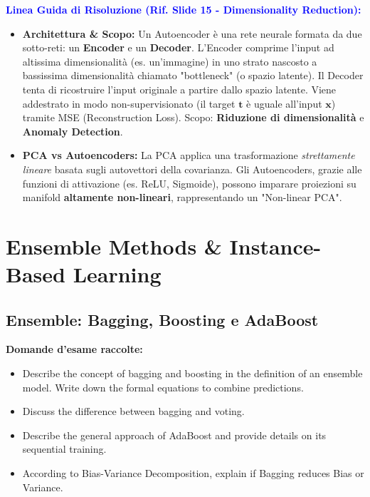 \documentclass[11pt,a4paper]{article}
\begin{document}
\textbf{\textcolor{blue}{Linea Guida di Risoluzione (Rif. Slide 15 - Dimensionality Reduction):}}
\begin{itemize}
    \item \textbf{Architettura \& Scopo:} Un Autoencoder è una rete neurale formata da due sotto-reti: un \textbf{Encoder} e un \textbf{Decoder}. L'Encoder comprime l'input ad altissima dimensionalità (es. un'immagine) in uno strato nascosto a bassissima dimensionalità chiamato "bottleneck" (o spazio latente). Il Decoder tenta di ricostruire l'input originale a partire dallo spazio latente. Viene addestrato in modo non-supervisionato (il target $\mathbf{t}$ è uguale all'input $\mathbf{x}$) tramite MSE (Reconstruction Loss). Scopo: \textbf{Riduzione di dimensionalità} e \textbf{Anomaly Detection}.
    \item \textbf{PCA vs Autoencoders:} La PCA applica una trasformazione \textit{strettamente lineare} basata sugli autovettori della covarianza. Gli Autoencoders, grazie alle funzioni di attivazione (es. ReLU, Sigmoide), possono imparare proiezioni su manifold \textbf{altamente non-lineari}, rappresentando un "Non-linear PCA".
\end{itemize}


\section{Ensemble Methods \& Instance-Based Learning}

\subsection{Ensemble: Bagging, Boosting e AdaBoost}
\textbf{Domande d'esame raccolte:}
\begin{itemize}
    \item Describe the concept of bagging and boosting in the definition of an ensemble model. Write down the formal equations to combine predictions.
    \item Discuss the difference between bagging and voting.
    \item Describe the general approach of AdaBoost and provide details on its sequential training.
    \item According to Bias-Variance Decomposition, explain if Bagging reduces Bias or Variance.
\end{itemize}
\end{document}
